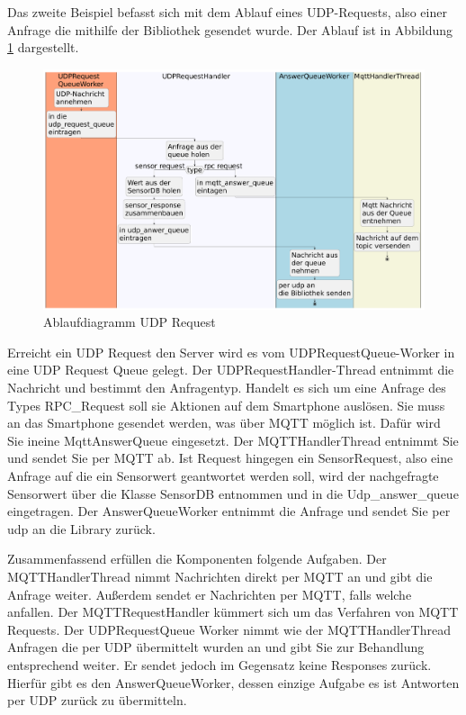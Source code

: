 \documentclass[11pt,a4paper]{report}
\begin{document}
Das zweite Beispiel befasst sich mit dem Ablauf eines UDP-Requests, also einer Anfrage die mithilfe der Bibliothek gesendet wurde.
Der Ablauf ist in Abbildung \ref{fig:serverUDPReqPath} dargestellt.
\begin{figure}[htbp]
  \centering
  \includegraphics[width=\textwidth]{images/UDPRequestServerPath}
  \caption{Ablaufdiagramm UDP Request}
  \label{fig:serverUDPReqPath}
\end{figure}
Erreicht ein UDP Request den Server wird es vom UDPRequestQueue-Worker in eine UDP Request Queue gelegt.
Der UDPRequestHandler-Thread entnimmt die Nachricht und bestimmt den Anfragentyp.
Handelt es sich um eine Anfrage des Types RPC\_Request soll sie Aktionen auf dem Smartphone auslösen.
Sie muss an das Smartphone gesendet werden, was über MQTT möglich ist.
Dafür wird Sie ineine MqttAnswerQueue eingesetzt.
Der MQTTHandlerThread entnimmt Sie und sendet Sie per MQTT ab.
Ist Request hingegen ein SensorRequest, also eine Anfrage auf die ein Sensorwert geantwortet werden soll, wird der nachgefragte Sensorwert über die Klasse SensorDB entnommen und in die Udp\_answer\_queue eingetragen.
Der AnswerQueueWorker entnimmt die Anfrage und sendet Sie per udp an die Library zurück.

Zusammenfassend erfüllen die Komponenten folgende Aufgaben.
Der MQTTHandlerThread nimmt Nachrichten direkt per MQTT an und gibt die Anfrage weiter.
Außerdem sendet er Nachrichten per MQTT, falls welche anfallen.
Der MQTTRequestHandler kümmert sich um das Verfahren von MQTT Requests.
Der UDPRequestQueue Worker nimmt wie der MQTTHandlerThread Anfragen die per UDP übermittelt wurden an und gibt Sie zur Behandlung entsprechend weiter.
Er sendet jedoch im Gegensatz keine Responses zurück.
Hierfür gibt es den AnswerQueueWorker, dessen einzige Aufgabe es ist Antworten per UDP zurück zu übermitteln.
\end{document}
